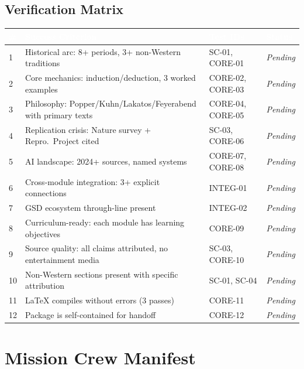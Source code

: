 \documentclass[11pt,letterpaper]{article}
\newcommand{\tableheader}[1]{\textbf{\sffamily\textcolor{white}{#1}}}
\begin{document}
\subsection{Verification Matrix}

\begin{center}
\begin{tabularx}{\textwidth}{C{0.5cm}L{5cm}L{3.5cm}C{2cm}}
\toprule
{}
\tableheader{\#} & \tableheader{Success Criterion} & \tableheader{Test IDs} & \tableheader{Status} \\
 & Historical arc: 8+ periods, 3+ non-Western traditions & SC-01, CORE-01 & \textit{Pending} \\
2 & Core mechanics: induction/deduction, 3 worked examples & CORE-02, CORE-03 & \textit{Pending} \\
3 & Philosophy: Popper/Kuhn/Lakatos/Feyerabend with primary texts & CORE-04, CORE-05 & \textit{Pending} \\
4 & Replication crisis: Nature survey + Repro.\ Project cited & SC-03, CORE-06 & \textit{Pending} \\
5 & AI landscape: 2024+ sources, named systems & CORE-07, CORE-08 & \textit{Pending} \\
6 & Cross-module integration: 3+ explicit connections & INTEG-01 & \textit{Pending} \\
7 & GSD ecosystem through-line present & INTEG-02 & \textit{Pending} \\
8 & Curriculum-ready: each module has learning objectives & CORE-09 & \textit{Pending} \\
9 & Source quality: all claims attributed, no entertainment media & SC-03, CORE-10 & \textit{Pending} \\
10 & Non-Western sections present with specific attribution & SC-01, SC-04 & \textit{Pending} \\
11 & LaTeX compiles without errors (3 passes) & CORE-11 & \textit{Pending} \\
12 & Package is self-contained for handoff & CORE-12 & \textit{Pending} \\
\bottomrule
\end{tabularx}
\end{center}

\section{Mission Crew Manifest}
\end{document}
